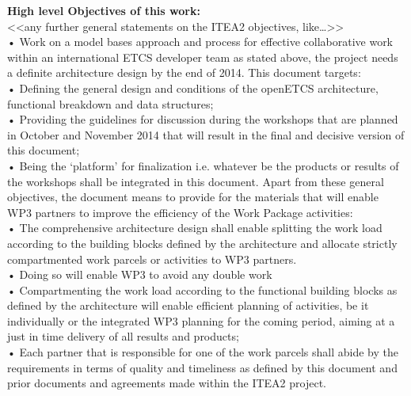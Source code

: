 \documentclass{template/openetcs_report}
\begin{document}
\textbf{High level Objectives of this work:}\\
<<any further general statements on the ITEA2  objectives, like…>>\\
• Work on a model bases approach and process for effective collaborative work within an international ETCS developer team
as stated above, the project needs a definite architecture design by the end of 2014.  This document targets:\\
•	Defining the general design and conditions of the openETCS architecture, functional breakdown and data structures;\\
•	Providing the guidelines for discussion during the workshops that are planned in October and November 2014 that will result in the final and decisive version of this document;\\
•	Being the ‘platform’ for finalization i.e. whatever be the products or results of the workshops shall be integrated in this document. 
Apart from these general objectives, the document means to provide for the materials that will enable WP3 partners to improve the efficiency of the Work Package activities:\\
• The comprehensive architecture design shall enable splitting the work load according to the building blocks defined by the architecture and allocate strictly compartmented work parcels or activities to WP3 partners. \\
• Doing so will enable WP3 to avoid any double work\\
• Compartmenting the work load according to the functional building blocks as defined by the architecture will enable efficient planning of activities, be it individually or the integrated WP3 planning for the coming period, aiming at a just in time delivery of all results and products;\\
• Each partner that is responsible for one of the work parcels shall abide by the requirements in terms of quality and timeliness as defined by this document and prior documents and agreements made within the ITEA2 project.\\
\end{document}
